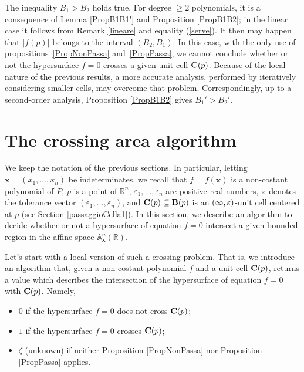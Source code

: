 \documentclass[10pt]{article}
\newcommand\reals{{\mathbb R}}
\newcommand{\x}{{\bm x}}
\newtheorem{re}[theorem]{Remark}
\newenvironment{rem*}{\begin{re}\em}{\end{re}}
\begin{document}
{\begin{rem*}\label{REM} The inequality  $B_1 > B_2$ holds true. 
For degree $\geq 2$ polynomials, it is a consequence of  Lemma \ref{PropB1B1'} and Proposition \ref{PropB1B2}; in the linear case 
it follows  from Remark \ref{lineare} and equality (\ref{serve}).
It then may happen that $|f(p)|$ belongs to the interval $(B_2, B_1)$.
In this case, with the only use of propositions~\ref{PropNonPassa}
and~\ref{PropPassa}, we cannot conclude whether or not  the hypersurface $f=0$ crosses a given  unit cell ${\bf C}(p)$.
Because of the local nature of the previous results,
a more accurate  analysis, performed by iteratively considering smaller cells, may overcome 
that problem. Correspondingly, up to a second-order analysis, Proposition \ref{PropB1B2} gives  $B_1' > B_2'$.
\end{rem*}

\section{The crossing area algorithm}
\label{RAL}\addtocounter{subsection}{1}\setcounter{theorem}{0}


We keep the notation of the previous sections. In particular,  letting $\x=(x_1,\ldots,x_n)$ be indeterminates, we recall 
that $f=f(\x)$ is a non-costant polynomial of $P$, 
$p$ is a point of $\mathbb R^n$, $\varepsilon_1,\ldots,\varepsilon_n$
are positive real numbers, ${\bm \varepsilon}$ denotes the  tolerance   vector $(\varepsilon_1,\ldots,\varepsilon_n)$, 
and ${\bf C}(p) \subseteq {\bf B}(p)$ is an $(\infty,{\bf \varepsilon})$-unit cell centered
at $p$ (see Section \ref{passaggioCella1}). 
In this section, we describe  an algorithm to decide whether or not 
a hypersurface of equation $f=0$  intersect a given bounded region
in the affine space ${\mathbb A}_{\x}^n(\reals)$.

Let's start with a local version of  such a  crossing problem. That is, we introduce
an algorithm that, given a non-costant polynomial $f$ and a unit cell ${\bf C}(p)$, 
returns a value which describes the intersection of the hypersurface of equation $f=0$ 
with  ${\bf C}(p)$. Namely,
\begin{itemize}
\item $0$ if the hypersurface  $f=0$ does not cross ${\bf C}(p)$;
\item $1$ if the hypersurface  $f=0$ crosses ${\bf C}(p)$;
\item $\zeta$ (unknown) if neither Proposition \ref{PropNonPassa} nor Proposition  \ref{PropPassa} applies.
\end{itemize}

}
\end{document}
